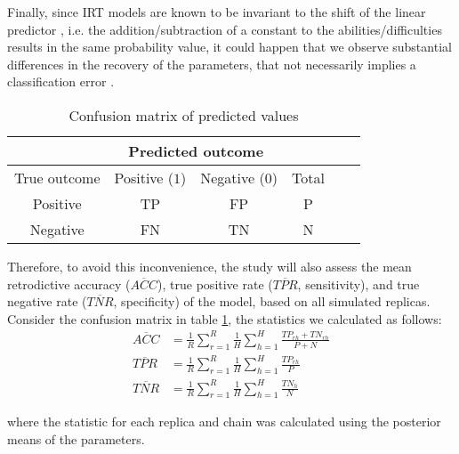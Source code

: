 Finally, since IRT models are known to be invariant to the shift of the linear predictor \cite{Baker_et_al_1992, Bock_1972}, i.e. the addition/subtraction of a constant to the abilities/difficulties results in the same probability value, it could happen that we observe substantial differences in the recovery of the parameters, that not necessarily implies a classification error  \cite{Wollack_2002}. 
%
\begin{table}[!h]
	\centering
	\begin{tabular}{ c|c|c|cc|c| } 
		& \multicolumn{2}{c}{Predicted outcome} \\
		\hline
		\hline
		True outcome 	& Positive ($1$) 	& Negative ($0$) 	& Total \\
		\hline
		\hline
		Positive 		& TP 				& FP 				& P \\ 
		Negative 		& FN 				& TN 				& N \\ 
	\end{tabular}
	\caption{Confusion matrix of predicted values}
	\label{tab:confusion_matrix}
\end{table}

Therefore, to avoid this inconvenience, the study will also assess the mean retrodictive accuracy ($\overline{ACC}$), true positive rate ($\overline{TPR}$, sensitivity), and true negative rate ($\overline{TNR}$, specificity) of the model, based on all simulated replicas. Consider the confusion matrix in table \ref{tab:confusion_matrix}, the statistics we calculated as follows:
%
\begin{align}
	\overline{ACC} &= \frac{1}{R} \sum_{r=1}^{R} \frac{1}{H} \sum_{h=1}^{H} \frac{TP_{rh} + TN_{rh}}{ P + N} \\
	\overline{TPR} &= \frac{1}{R} \sum_{r=1}^{R} \frac{1}{H} \sum_{h=1}^{H} \frac{TP_{rh}}{P} \\
	\overline{TNR} &= \frac{1}{R} \sum_{r=1}^{R} \frac{1}{H} \sum_{h=1}^{H} \frac{TN_{h}}{N}
\end{align}

\noindent where the statistic for each replica and chain was calculated using the posterior means of the parameters.


